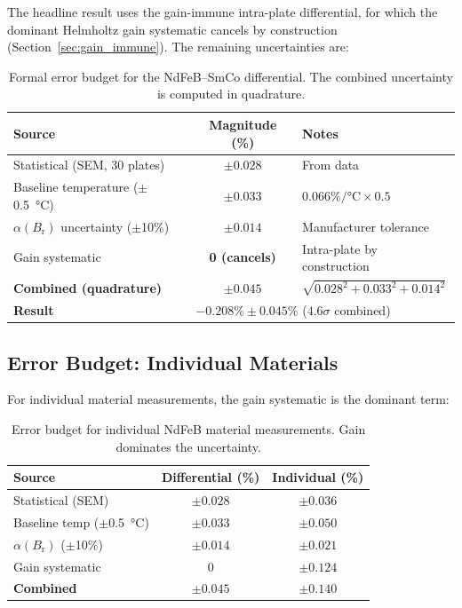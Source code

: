 \documentclass[11pt,letterpaper]{article}
\newcommand{\Br}{B_\mathrm{r}}
\newcommand{\alphar}{\alpha(\Br)}
\begin{document}
The headline result uses the gain-immune intra-plate differential, for which
the dominant Helmholtz gain systematic cancels by construction
(Section~\ref{sec:gain_immune}). The remaining uncertainties are:

\begin{table}[H]
\centering
\caption{Formal error budget for the NdFeB--SmCo differential. The combined
uncertainty is computed in quadrature.}
\label{tab:error_budget}
\begin{tabular}{@{}lcl@{}}
\toprule
\textbf{Source} & \textbf{Magnitude (\%)} & \textbf{Notes} \\
\midrule
Statistical (SEM, 30 plates) & $\pm 0.028$ & From data \\
Baseline temperature ($\pm$\SI{0.5}{\celsius}) & $\pm 0.033$ & $0.066\%/\si{\celsius} \times 0.5$ \\
$\alphar$ uncertainty ($\pm$10\%) & $\pm 0.014$ & Manufacturer tolerance \\
Gain systematic & \textbf{0 (cancels)} & Intra-plate by construction \\
\midrule
\textbf{Combined (quadrature)} & $\pm 0.045$ & $\sqrt{0.028^2 + 0.033^2 + 0.014^2}$ \\
\midrule\midrule
\textbf{Result} & \multicolumn{2}{l}{$\mathbf{-0.208\% \pm 0.045\%}$ ($4.6\sigma$ combined)} \\
\bottomrule
\end{tabular}
\end{table}

\subsection{Error Budget: Individual Materials}

For individual material measurements, the gain systematic is the dominant term:

\begin{table}[H]
\centering
\caption{Error budget for individual NdFeB material measurements. Gain
dominates the uncertainty.}
\label{tab:error_budget_individual}
\begin{tabular}{@{}lcc@{}}
\toprule
\textbf{Source} & \textbf{Differential (\%)} & \textbf{Individual (\%)} \\
\midrule
Statistical (SEM) & $\pm 0.028$ & $\pm 0.036$ \\
Baseline temp ($\pm$\SI{0.5}{\celsius}) & $\pm 0.033$ & $\pm 0.050$ \\
$\alphar$ ($\pm$10\%) & $\pm 0.014$ & $\pm 0.021$ \\
Gain systematic & $0$ & $\pm 0.124$ \\
\midrule
\textbf{Combined} & $\pm 0.045$ & $\pm 0.140$ \\
\bottomrule
\end{tabular}
\end{table}
\end{document}
